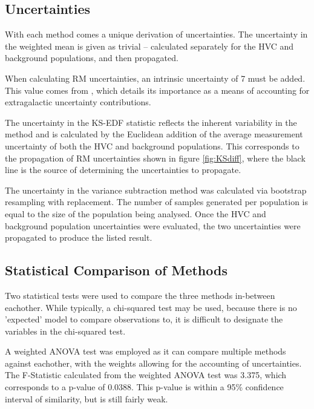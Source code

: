 \subsection{Uncertainties}
\label{ssec:results_uncertainties}

With each method comes a unique derivation of uncertainties. The uncertainty in the weighted mean is given as trivial – calculated separately for the HVC and background populations, and then propagated.

When calculating RM uncertainties, an intrinsic uncertainty of 7 must be added. This value comes from \cite{ID21}, which details its importance as a means of accounting for extragalactic uncertainty contributions.


The uncertainty in the KS-EDF statistic reflects the inherent variability in the method and is calculated by the Euclidean addition of the average measurement uncertainty of both the HVC and background populations. This corresponds to the propagation of RM uncertainties shown in figure \ref{fig:KSdiff}, where the black line is the source of determining the uncertainties to propagate.


The uncertainty in the variance subtraction method was calculated via bootstrap resampling with replacement. The number of samples generated per population is equal to the size of the population being analysed. Once the HVC and background population uncertainties were evaluated, the two uncertainties were propagated to produce the listed result.

\subsection{Statistical Comparison of Methods}
\label{ssec:results_stats}

Two statistical tests were used to compare the three methods in-between eachother. While typically, a chi-squared test may be used, because there is no 'expected' model to compare observations to, it is difficult to designate the variables in the chi-squared test.

A weighted ANOVA test was employed as it can compare multiple methods against eachother, with the weights allowing for the accounting of uncertainties. The F-Statistic calculated from the weighted ANOVA test was 3.375, which corresponds to a p-value of 0.0388. This p-value is within a 95\% confidence interval of similarity, but is still fairly weak.

